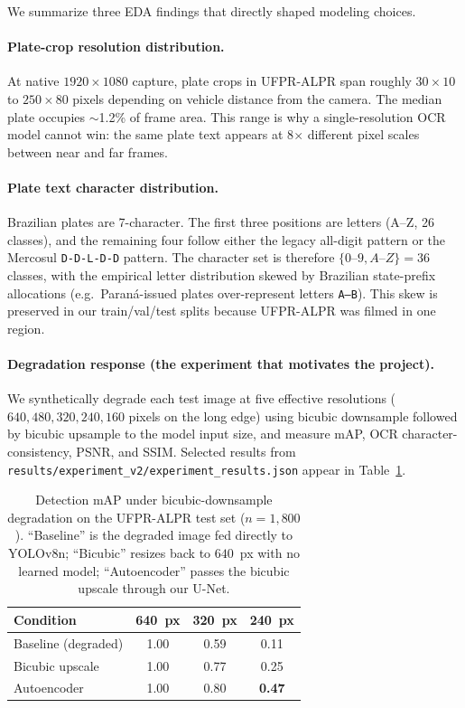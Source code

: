 \documentclass[11pt]{article}
\begin{document}
We summarize three EDA findings that directly shaped modeling choices.

\paragraph{Plate-crop resolution distribution.}
At native $1920\times1080$ capture, plate crops in UFPR-ALPR span roughly
$30\times10$ to $250\times80$ pixels depending on vehicle distance from the
camera. The median plate occupies $\sim$1.2\% of frame area. This range is
why a single-resolution OCR model cannot win: the same plate text appears at
8$\times$ different pixel scales between near and far frames.

\paragraph{Plate text character distribution.}
Brazilian plates are 7-character. The first three positions are letters
(A--Z, 26 classes), and the remaining four follow either the legacy
all-digit pattern or the Mercosul \texttt{D-D-L-D-D} pattern. The character
set is therefore $\{0\text{--}9, A\text{--}Z\} = 36$ classes, with the
empirical letter distribution skewed by Brazilian state-prefix allocations
(e.g.\ Paran\'a-issued plates over-represent letters \texttt{A--B}). This
skew is preserved in our train/val/test splits because UFPR-ALPR was filmed
in one region.

\paragraph{Degradation response (the experiment that motivates the project).}
We synthetically degrade each test image at five effective resolutions
($640, 480, 320, 240, 160$ pixels on the long edge) using bicubic downsample
followed by bicubic upsample to the model input size, and measure
mAP, OCR character-consistency, PSNR, and SSIM. Selected results from
\texttt{results/experiment\_v2/experiment\_results.json} appear in
Table~\ref{tab:degradation}.

\begin{table}[H]
\centering
\caption{Detection mAP under bicubic-downsample degradation on the UFPR-ALPR
test set ($n=1{,}800$). ``Baseline'' is the degraded image fed directly to
YOLOv8n; ``Bicubic'' resizes back to $640$~px with no learned model;
``Autoencoder'' passes the bicubic upscale through our U-Net.}
\label{tab:degradation}
\begin{tabular}{lccc}
\toprule
Condition & 640~px & 320~px & 240~px \\
\midrule
Baseline (degraded)   & 1.00 & 0.59 & 0.11 \\
Bicubic upscale       & 1.00 & 0.77 & 0.25 \\
Autoencoder           & 1.00 & 0.80 & \textbf{0.47} \\
\bottomrule
\end{tabular}
\end{table}
\end{document}
